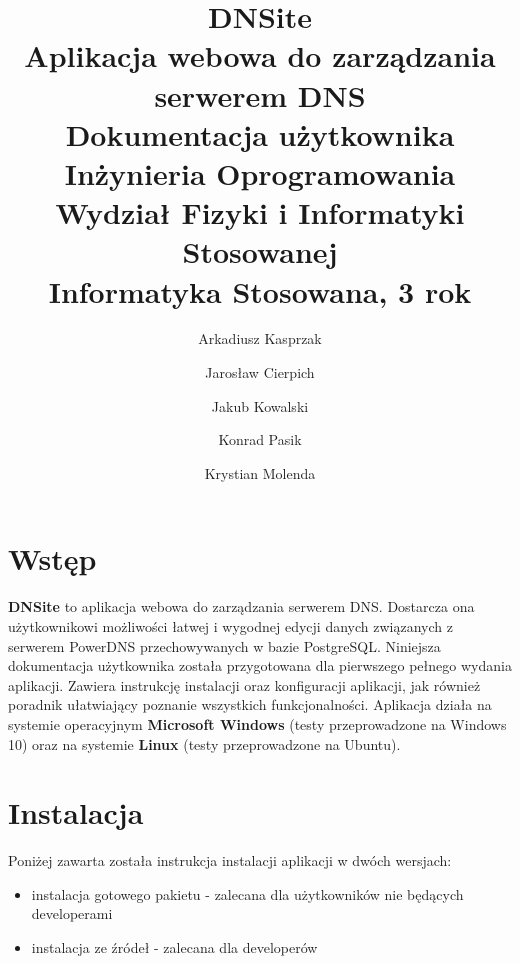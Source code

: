 \documentclass[12pt] {article}
\title 
{	
	{
		\textbf{\textsf{\Huge\color{orange}DNS\color{white}ite}} \\ [0.1in]
		\normalfont\sffamily\LARGE\color{white}
		Aplikacja webowa do zarządzania serwerem DNS \\[0.1in]
		Dokumentacja użytkownika\\ [1.5in]
		\large 
		Inżynieria Oprogramowania \\
		Wydział Fizyki i Informatyki Stosowanej \\
		Informatyka Stosowana, 3 rok \\
	}
}
\author 
{
	\color{white}\normalfont\sffamily Arkadiusz Kasprzak \and 
	\color{white}\normalfont\sffamily Jarosław Cierpich \and 
	\color{white}\normalfont\sffamily Jakub Kowalski \and 
	\color{white}\normalfont\sffamily Konrad Pasik \and 
	\color{white}\normalfont\sffamily Krystian Molenda
}
\date{}
\begin{document}
\pagecolor{backgroundColor}
\maketitle
\thispagestyle{empty}


\newpage
\clearpage
{}
\pagecolor{white}

\tableofcontents

\newpage 

\section{Wstęp}
\textbf{DNSite} to aplikacja webowa do zarządzania serwerem DNS. Dostarcza ona użytkownikowi możliwości łatwej i wygodnej edycji danych związanych z serwerem PowerDNS przechowywanych w bazie PostgreSQL.\newline
Niniejsza dokumentacja użytkownika została przygotowana dla pierwszego pełnego wydania aplikacji. Zawiera instrukcję instalacji oraz konfiguracji aplikacji, jak również poradnik ułatwiający poznanie wszystkich funkcjonalności. \newline
Aplikacja działa na systemie operacyjnym \textbf{Microsoft Windows} (testy przeprowadzone na Windows 10) oraz na systemie \textbf{Linux} (testy przeprowadzone na Ubuntu).

\section{Instalacja}
Poniżej zawarta została instrukcja instalacji aplikacji w dwóch wersjach:
\begin{itemize}
\item instalacja gotowego pakietu - zalecana dla użytkowników nie będących developerami
\item instalacja ze źródeł - zalecana dla developerów 
\end{itemize}
\end{document}
